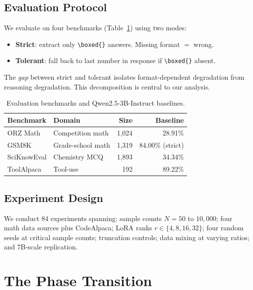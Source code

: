 \documentclass{article}
\begin{document}
\subsection{Evaluation Protocol}

We evaluate on four benchmarks (Table~\ref{tab:benchmarks}) using two modes:
\begin{itemize}
    \item \textbf{Strict}: extract only \texttt{\textbackslash boxed\{\}} answers. Missing format $=$ wrong.
    \item \textbf{Tolerant}: fall back to last number in response if \texttt{\textbackslash boxed\{\}} absent.
\end{itemize}
The \emph{gap} between strict and tolerant isolates format-dependent degradation from reasoning degradation. This decomposition is central to our analysis.

\begin{table}[h]
\centering
\caption{Evaluation benchmarks and Qwen2.5-3B-Instruct baselines.}
\label{tab:benchmarks}
\small
\begin{tabular}{@{}llrr@{}}
\toprule
Benchmark & Domain & Size & Baseline \\
\midrule
ORZ Math & Competition math & 1,024 & 28.91\% \\
GSM8K & Grade-school math & 1,319 & 84.00\% (strict) \\
SciKnowEval & Chemistry MCQ & 1,893 & 34.34\% \\
ToolAlpaca & Tool-use & 192 & 89.22\% \\
\bottomrule
\end{tabular}
\end{table}

\subsection{Experiment Design}

We conduct 84 experiments spanning: sample counts $N{=}50$ to $10{,}000$; four math data sources plus CodeAlpaca; LoRA ranks $r \in \{4, 8, 16, 32\}$; four random seeds at critical sample counts; truncation controls; data mixing at varying ratios; and 7B-scale replication.

\section{The Phase Transition}
\label{sec:transition}
\end{document}
